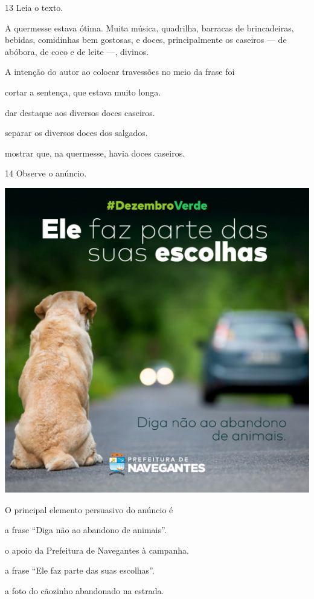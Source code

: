 \num{13} Leia o texto.

\begin{myquote}
A quermesse estava ótima. Muita música, quadrilha, barracas de
brincadeiras, bebidas, comidinhas bem gostosas, e doces, principalmente
os caseiros --- de abóbora, de coco e de leite ---, divinos.

\end{myquote}

A intenção do autor ao colocar travessões no meio da frase foi

\begin{escolha}
\item cortar a sentença, que estava muito longa.

\item dar destaque aos diversos doces caseiros.

\item separar os diversos doces dos salgados.

\item mostrar que, na quermesse, havia doces caseiros.
\end{escolha}

\num{14} Observe o anúncio.
\vspace{2ex}

\begin{center}
\includegraphics[width=.6\textwidth]{./media/simulados/image6.png}
\end{center}

O principal elemento persuasivo do anúncio é

\begin{escolha}
\item a frase ``Diga não ao abandono de animais''.

\item o apoio da Prefeitura de Navegantes à campanha.

\item a frase ``Ele faz parte das suas escolhas''.

\item a foto do cãozinho abandonado na estrada.
\end{escolha}


